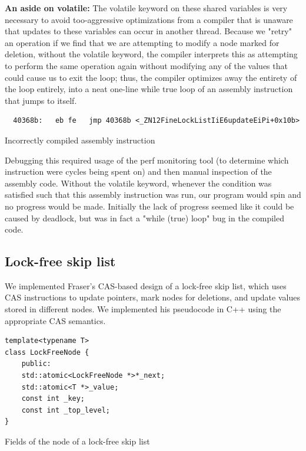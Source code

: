 \documentclass[11pt]{article}
\begin{document}
\textbf{An aside on volatile:} The volatile keyword on these shared variables is very necessary to avoid too-aggressive optimizations from a compiler that is unaware that updates to these variables can occur in another thread. Because we "retry" an operation if we find that we are attempting to modify a node marked for deletion, without the volatile keyword, the compiler interprets this as attempting to perform the same operation again without modifying any of the values that could cause us to exit the loop; thus, the compiler optimizes away the entirety of the loop entirely, into a neat one-line while true loop of an assembly instruction that jumps to itself. 
\begin{listing}[!ht]
\begin{verbatim}
  40368b:   eb fe   jmp 40368b <_ZN12FineLockListIiE6updateEiPi+0x10b>
\end{verbatim}
\caption{Incorrectly compiled assembly instruction}
\label{listing:3}
\end{listing}

Debugging this required usage of the perf monitoring tool (to determine which instruction were cycles being spent on) and then manual inspection of the assembly code. Without the volatile keyword, whenever the condition was satisfied such that this assembly instruction was run, our program would spin and no progress would be made. Initially the lack of progress seemed like it could be caused by deadlock, but was in fact a "while (true) loop" bug in the compiled code.

\subsection{Lock-free skip list}
We implemented Fraser's CAS-based design of a lock-free skip list, which uses CAS instructions to update pointers, mark nodes for deletions, and update values stored in different nodes. We implemented his pseudocode in C++ using the appropriate CAS semantics. \cite{fraser2004practical}
\begin{listing}[!ht]
\begin{verbatim}
template<typename T>
class LockFreeNode {
    public:
    std::atomic<LockFreeNode *>*_next;
    std::atomic<T *>_value;
    const int _key;
    const int _top_level;
}
\end{verbatim}
\caption{Fields of the node of a lock-free skip list}
\label{listing:4}
\end{listing}
\end{document}
